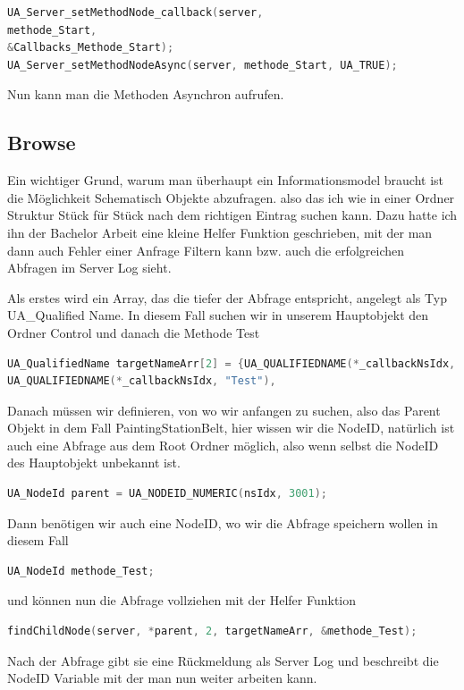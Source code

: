 \begin{lstlisting}[language=C]
UA_Server_setMethodNode_callback(server,
methode_Start,
&Callbacks_Methode_Start);
UA_Server_setMethodNodeAsync(server, methode_Start, UA_TRUE);
\end{lstlisting}

Nun kann man die Methoden Asynchron aufrufen.

\subsection{Browse}
Ein wichtiger Grund, warum man überhaupt ein Informationsmodel braucht ist die Möglichkeit Schematisch Objekte abzufragen. also das ich wie in einer Ordner Struktur Stück für Stück nach dem richtigen Eintrag suchen kann. Dazu hatte ich ihn der Bachelor Arbeit eine kleine Helfer Funktion geschrieben, mit der man dann auch Fehler einer Anfrage Filtern kann bzw. auch die erfolgreichen Abfragen im Server Log sieht.

Als erstes wird ein Array, das die tiefer der Abfrage entspricht, angelegt als Typ UA\_Qualified Name. In diesem Fall suchen wir in unserem Hauptobjekt den Ordner Control und danach die Methode Test

\begin{lstlisting}[language=C]
UA_QualifiedName targetNameArr[2] = {UA_QUALIFIEDNAME(*_callbackNsIdx, "Control"), 
UA_QUALIFIEDNAME(*_callbackNsIdx, "Test"), 
\end{lstlisting}
Danach müssen wir definieren, von wo wir anfangen zu suchen, also das Parent Objekt in dem Fall PaintingStationBelt, hier wissen wir die NodeID, natürlich ist auch eine Abfrage aus dem Root Ordner möglich, also wenn selbst die NodeID des Hauptobjekt unbekannt ist.
\begin{lstlisting}[language=C]
UA_NodeId parent = UA_NODEID_NUMERIC(nsIdx, 3001);
\end{lstlisting}
Dann benötigen wir auch eine NodeID, wo wir die Abfrage speichern wollen in diesem Fall 
\begin{lstlisting}[language=C]
UA_NodeId methode_Test;
\end{lstlisting}
und können nun die Abfrage vollziehen mit der Helfer Funktion
\begin{lstlisting}[language=C]
findChildNode(server, *parent, 2, targetNameArr, &methode_Test);
\end{lstlisting}
Nach der Abfrage gibt sie eine Rückmeldung als Server Log und beschreibt die NodeID Variable mit der man nun weiter arbeiten kann.

